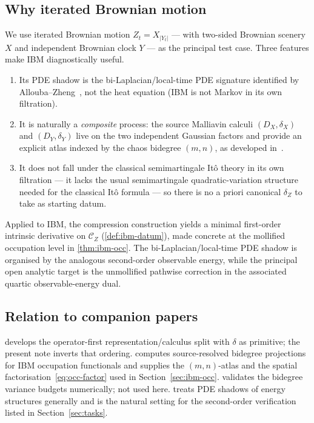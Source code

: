 \documentclass[11pt,reqno]{amsart}
\theoremstyle{plain}
\theoremstyle{definition}
\theoremstyle{remark}
\newcommand{\IBM}{Z}
\begin{document}
\subsection*{Why iterated Brownian motion}
We use iterated Brownian motion
$\IBM_t = X_{|Y_t|}$
--- with two-sided Brownian scenery $X$ and independent Brownian clock
$Y$ --- as the principal test case. Three features make IBM
diagnostically useful.
\begin{enumerate}
\item Its PDE shadow is the bi-Laplacian/local-time PDE signature
  identified by Allouba--Zheng~\cite{AllouZheng}, not the heat equation
  (IBM is not Markov in its own filtration).
\item It is naturally a \emph{composite} process: the source Malliavin
  calculi $(D_X,\delta_X)$ and $(D_Y,\delta_Y)$ live on the two
  independent Gaussian factors and provide an explicit atlas indexed by
  the chaos bidegree $(m,n)$, as developed in~\cite{Fontes-IBMchaos}.
\item It does not fall under the classical semimartingale It\^o
  theory in its own filtration --- it lacks the usual semimartingale
  quadratic-variation structure needed for the classical It\^o
  formula --- so there is no a priori canonical $\delta_\IBM$ to
  take as starting datum.
\end{enumerate}
Applied to IBM, the compression construction yields a minimal
first-order intrinsic derivative on $\mathcal C_\IBM$
(\cref{def:ibm-datum}), made concrete at the mollified occupation
level in \cref{thm:ibm-occ}. The bi-Laplacian/local-time PDE shadow
is organised by the analogous second-order observable energy, while
the principal open analytic target is the unmollified pathwise
correction in the associated quartic observable-energy dual.

\subsection*{Relation to companion papers}
\cite{Fontes-OperatorDerivative} develops the operator-first
representation/calculus split with $\delta$ as primitive; the present
note inverts that ordering. \cite{Fontes-IBMchaos} computes
source-resolved bidegree projections for IBM occupation functionals
and supplies the $(m,n)$-atlas and the spatial
factorisation~\eqref{eq:occ-factor} used in
Section~\ref{sec:ibm-occ}. \cite{Fontes-IBMnumerical} validates the
bidegree variance budgets numerically; not used here.
\cite{Fontes-PDEgenerators} treats PDE shadows of energy structures
generally and is the natural setting for the second-order
verification listed in Section~\ref{sec:tasks}.
\end{document}
